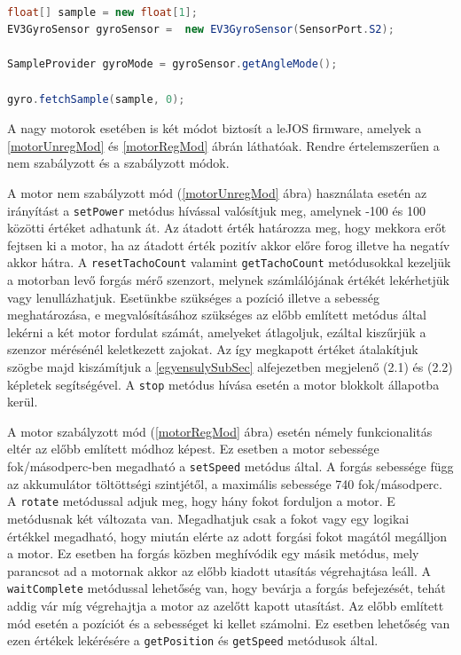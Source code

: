\begin{lstlisting}[label=gyroAngleMod, caption= Giroszkóp szenzor \texttt{angle} mód használata, language=Java]

float[] sample = new float[1];
EV3GyroSensor gyroSensor =  new EV3GyroSensor(SensorPort.S2);

SampleProvider gyroMode = gyroSensor.getAngleMode();

gyro.fetchSample(sample, 0);

\end{lstlisting}

A nagy motorok esetében is két módot biztosít a leJOS firmware, amelyek a \ref{motorUnregMod} és \ref{motorRegMod} ábrán láthatóak. Rendre értelemszerűen a nem szabályzott és a szabályzott módok. 

A motor nem szabályzott mód (\ref{motorUnregMod} ábra) használata esetén az irányítást a \texttt{setPower} metódus hívással valósítjuk meg, amelynek -100 és 100 közötti értéket adhatunk át. Az átadott érték határozza meg, hogy mekkora erőt fejtsen ki a motor, ha az átadott érték pozitív akkor előre forog illetve ha negatív akkor hátra. A \texttt{resetTachoCount} valamint \texttt{getTachoCount} metódusokkal kezeljük a motorban levő forgás mérő szenzort, melynek számlálójának értékét lekérhetjük vagy lenullázhatjuk. Esetünkbe szükséges a pozíció illetve a sebesség meghatározása, e megvalósításához szükséges az előbb említett metódus által lekérni a két motor fordulat számát, amelyeket átlagoljuk, ezáltal kiszűrjük a szenzor mérésénél keletkezett zajokat. Az így megkapott értéket átalakítjuk szögbe majd kiszámítjuk a \ref{egyensulySubSec} alfejezetben megjelenő (2.1) és (2.2) képletek segítségével. A \texttt{stop} metódus hívása esetén a motor blokkolt állapotba kerül.    

A motor szabályzott mód (\ref{motorRegMod} ábra) esetén némely funkcionalitás eltér az előbb említett módhoz képest. Ez esetben a motor sebessége fok/másodperc-ben megadható a \texttt{setSpeed} metódus által. A forgás sebessége függ az akkumulátor töltöttségi szintjétől, a maximális sebessége 740 fok/másodperc. A \texttt{rotate} metódussal adjuk meg, hogy hány fokot forduljon a motor. E metódusnak két változata van. Megadhatjuk csak a fokot vagy egy logikai értékkel megadható, hogy miután elérte az adott forgási fokot magától megálljon a motor. Ez esetben ha forgás közben meghívódik egy másik metódus, mely parancsot ad a motornak akkor az előbb kiadott utasítás végrehajtása leáll. A \texttt{waitComplete} metódussal lehetőség van, hogy bevárja a forgás befejezését, tehát addig vár míg végrehajtja a motor az azelőtt kapott utasítást. Az előbb említett mód esetén a pozíciót és a sebességet ki kellet számolni. Ez esetben lehetőség van ezen értékek lekérésére a \texttt{getPosition} és \texttt{getSpeed} metódusok által.

